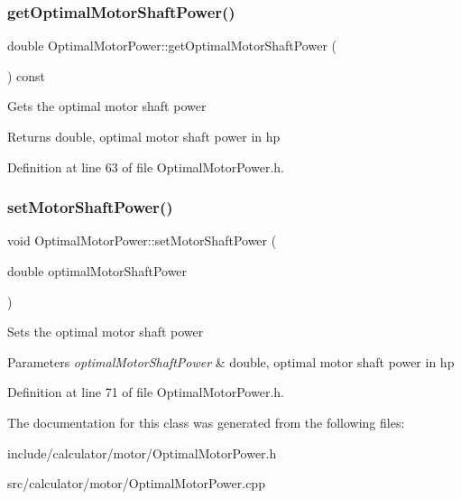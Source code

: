\subsubsection{\texorpdfstring{get\+Optimal\+Motor\+Shaft\+Power()}{getOptimalMotorShaftPower()}}
{\footnotesize\ttfamily double Optimal\+Motor\+Power\+::get\+Optimal\+Motor\+Shaft\+Power (\begin{DoxyParamCaption}{ }\end{DoxyParamCaption}) const\hspace{0.3cm}{\ttfamily [inline]}}

Gets the optimal motor shaft power \begin{DoxyReturn}{Returns}
double, optimal motor shaft power in hp 
\end{DoxyReturn}


Definition at line 63 of file Optimal\+Motor\+Power.\+h.

\mbox{\label{class_optimal_motor_power_ada8a9e3caac34c54470ad13ffe7edf53}} 
\subsubsection{\texorpdfstring{set\+Motor\+Shaft\+Power()}{setMotorShaftPower()}}
{\footnotesize\ttfamily void Optimal\+Motor\+Power\+::set\+Motor\+Shaft\+Power (\begin{DoxyParamCaption}\item[{double}]{optimal\+Motor\+Shaft\+Power }\end{DoxyParamCaption})\hspace{0.3cm}{\ttfamily [inline]}}

Sets the optimal motor shaft power 
\begin{DoxyParams}{Parameters}
{\em optimal\+Motor\+Shaft\+Power} & double, optimal motor shaft power in hp \\
\hline
\end{DoxyParams}


Definition at line 71 of file Optimal\+Motor\+Power.\+h.



The documentation for this class was generated from the following files\+:\begin{DoxyCompactItemize}
\item 
include/calculator/motor/Optimal\+Motor\+Power.\+h\item 
src/calculator/motor/Optimal\+Motor\+Power.\+cpp\end{DoxyCompactItemize}
